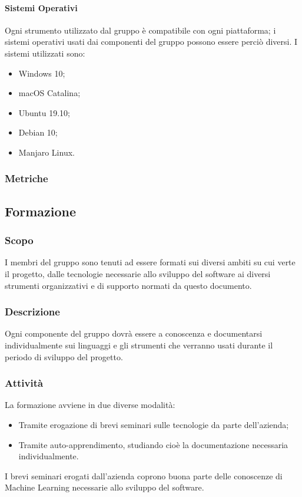 \documentclass[../norme-di-progetto.tex]{subfiles}
\begin{document}
\paragraph{Sistemi Operativi}
Ogni strumento utilizzato dal gruppo è compatibile con ogni piattaforma; i sistemi operativi usati dai componenti del gruppo possono essere perciò diversi. I sistemi utilizzati sono:
\begin{itemize}
  \item Windows 10;
  \item macOS Catalina;
  \item Ubuntu 19.10;
  \item Debian 10;
  \item Manjaro Linux.
\end{itemize}

\subsubsection{Metriche}


\subsection{Formazione}
\subsubsection{Scopo}
I membri del gruppo sono tenuti ad essere formati sui diversi ambiti su cui verte il progetto, dalle tecnologie necessarie allo sviluppo del software ai diversi strumenti organizzativi e di supporto normati da questo documento.

\subsubsection{Descrizione}
Ogni componente del gruppo dovrà essere a conoscenza e documentarsi individualmente sui linguaggi e gli strumenti che verranno usati durante il periodo di sviluppo del progetto.

\subsubsection{Attività}
La formazione avviene in due diverse modalità:
\begin{itemize}
  \item Tramite erogazione di brevi seminari sulle tecnologie da parte dell'azienda;
  \item Tramite auto-apprendimento, studiando cioè la documentazione necessaria individualmente.
\end{itemize}
I brevi seminari erogati dall'azienda coprono buona parte delle conoscenze di Machine Learning necessarie allo sviluppo del software.
\end{document}

